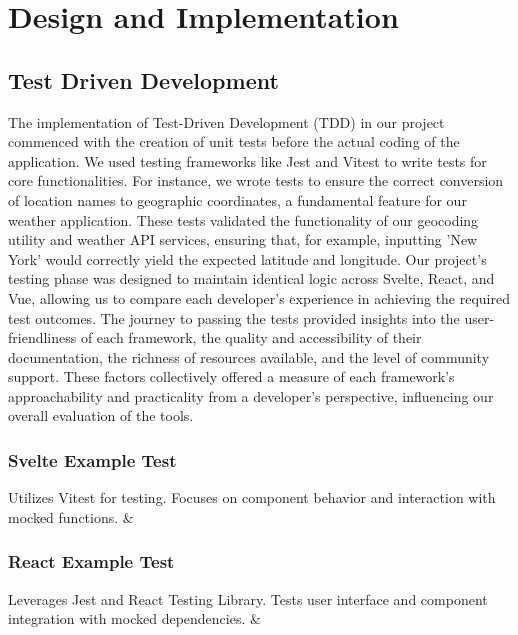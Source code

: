\section{Design and Implementation}

\subsection{Test Driven Development}

The implementation of Test-Driven Development (TDD) in our project commenced with the creation of unit tests before the actual coding of the application. We used testing frameworks like Jest and Vitest to write tests for core functionalities. For instance, we wrote tests to ensure the correct conversion of location names to geographic coordinates, a fundamental feature for our weather application. These tests validated the functionality of our geocoding utility and weather API services, ensuring that, for example, inputting 'New York' would correctly yield the expected latitude and longitude. Our project's testing phase was designed to maintain identical logic across Svelte, React, and Vue, allowing us to compare each developer's experience in achieving the required test outcomes. The journey to passing the tests provided insights into the user-friendliness of each framework, the quality and accessibility of their documentation, the richness of resources available, and the level of community support. These factors collectively offered a measure of each framework's approachability and practicality from a developer's perspective, influencing our overall evaluation of the tools.




\subsubsection{Svelte Example Test}

 

Utilizes Vitest for testing. Focuses on component behavior and interaction with mocked functions. & 

\subsubsection{React Example Test}

 

Leverages Jest and React Testing Library. Tests user interface and component integration with mocked dependencies. & 

